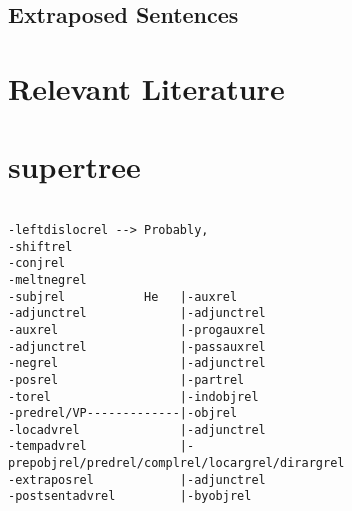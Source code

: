 \subsection{Extraposed Sentences}
\section{Relevant Literature}
\section{supertree}
\begin{verbatim}

-leftdislocrel --> Probably,
-shiftrel
-conjrel
-meltnegrel
-subjrel           He   |-auxrel
-adjunctrel             |-adjunctrel
-auxrel                 |-progauxrel
-adjunctrel             |-passauxrel
-negrel                 |-adjunctrel
-posrel                 |-partrel 
-torel                  |-indobjrel
-predrel/VP-------------|-objrel
-locadvrel              |-adjunctrel
-tempadvrel             |-prepobjrel/predrel/complrel/locargrel/dirargrel
-extraposrel            |-adjunctrel
-postsentadvrel         |-byobjrel


\end{verbatim}

